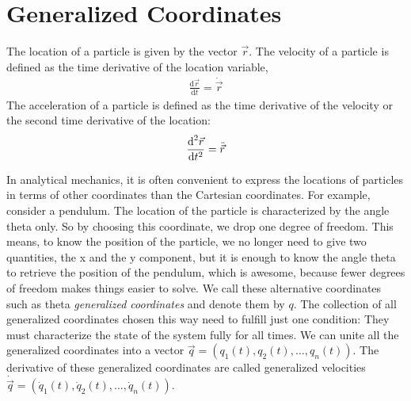 \section{Generalized Coordinates}
The location of a particle is given by the vector $\vec{r}$. \newline
The velocity of a particle is defined as the time derivative of the location variable, 
\begin{align}
    \frac{\text{d}\vec{r}}{\text{d}t} = \dot{\vec{r}}
\end{align}
The acceleration of a particle is defined as the time derivative of the velocity or the second time derivative of the location:
\begin{align}
    \frac{\text{d}^2\vec{r}}{\text{d}t^2} = \Ddot{\vec{r}}
\end{align}

In analytical mechanics, it is often convenient to express the locations of particles in terms of other coordinates than the Cartesian coordinates. For example, consider a pendulum. The location of the particle is characterized by the angle theta only. So by choosing this coordinate, we drop one degree of freedom. This means, to know the position of the particle, we no longer need to give two quantities, the x and the y component, but it is enough to know the angle theta to retrieve the position of the pendulum, which is awesome, because fewer degrees of freedom makes things easier to solve. We call these alternative coordinates such as theta \textit{generalized coordinates} and denote them by $q$. The collection of all generalized coordinates chosen this way need to fulfill just one condition: They must characterize the state of the system fully for all times. We can unite all the generalized coordinates into a vector  $\vec{q}=(q_1(t), q_2(t), \dots, q_n(t))$. The derivative of these generalized coordinates are called generalized velocities $\dot{\vec{q}}=(\dot{q}_1(t), \dot{q}_2(t),\dots,\dot{q}_n(t))$.
